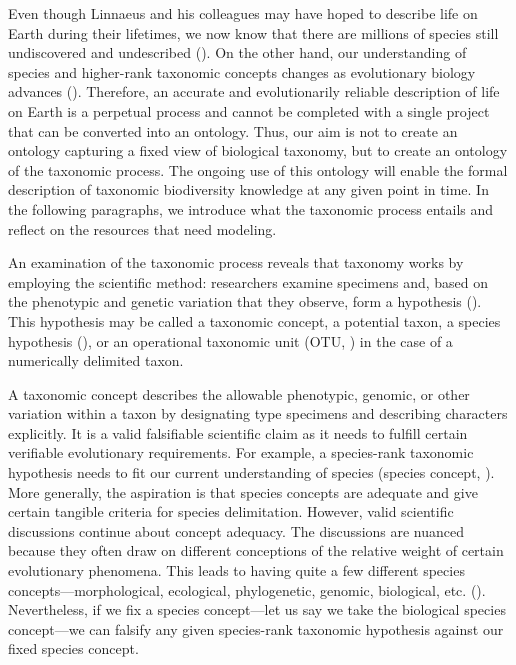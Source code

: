 Even though Linnaeus and his colleagues may have hoped to describe life on Earth during their lifetimes, we now know that there are millions of species still undiscovered and undescribed (\cite{trontelj_cryptic_2009}). On the other hand, our understanding of species and higher-rank taxonomic concepts changes as evolutionary biology advances (\cite{mallet_species_2001}). Therefore, an accurate and evolutionarily reliable description of life on Earth is a perpetual process and cannot be completed with a single project that can be converted into an ontology. Thus, our aim is not to create an ontology capturing a fixed view of biological taxonomy, but to create an ontology of the taxonomic process. The ongoing use of this ontology will enable the formal description of taxonomic biodiversity knowledge at any given point in time. In the following paragraphs, we introduce what the taxonomic process entails and reflect on the resources that need modeling.

An examination of the taxonomic process reveals that taxonomy works by employing the scientific method: researchers examine specimens and, based on the phenotypic and genetic variation that they observe, form a hypothesis (\cite{deans_time_2012}). This hypothesis may be called a taxonomic concept, a potential taxon, a species hypothesis (\cite{berendsohn_concept_1995}), or an operational taxonomic unit (OTU, \cite{sokal_principles_1963}) in the case of a numerically delimited taxon.

A taxonomic concept describes the allowable phenotypic, genomic, or other variation within a taxon by designating type specimens and describing characters explicitly. It is a valid falsifiable scientific claim as it needs to fulfill certain verifiable evolutionary requirements. For example, a species-rank taxonomic hypothesis needs to fit our current understanding of species (species concept,  \cite{mallet_species_2001}). More generally, the aspiration is that species concepts are adequate and give certain tangible criteria for species delimitation. However, valid scientific discussions continue about concept adequacy. The discussions are nuanced because they often draw on different conceptions of the relative weight of certain evolutionary phenomena. This leads to having quite a few different species concepts---morphological, ecological, phylogenetic, genomic, biological, etc. (\cite{mallet_species_2001}). Nevertheless, if we fix a species concept---let us say we take the biological species concept---we can falsify any given species-rank taxonomic hypothesis against our fixed species concept.

